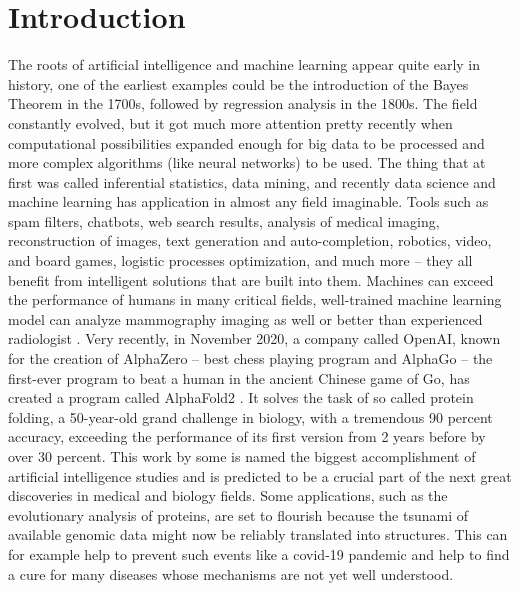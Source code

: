 \documentclass[a4paper,twoside,12pt]{book}
\newcounter{PagesWithoutNumbers}
\begin{document}
\setcounter{PagesWithoutNumbers}{\value{page}}
\mainmatter
\pagestyle{PageNumbersChapterTitles}



\chapter{Introduction}

The roots of artificial intelligence and machine learning appear quite early in history, one of the earliest examples could be the introduction of the Bayes Theorem in the 1700s, followed by regression analysis in the 1800s. The field constantly evolved, but it got much more attention pretty recently when computational possibilities expanded enough for big data to be processed and more complex algorithms (like neural networks) to be used.
The thing that at first was called inferential statistics, data mining, and recently data science and machine learning has application in almost any field imaginable. Tools such as spam filters, chatbots, web search results, analysis of medical imaging, reconstruction of images, text generation and auto-completion, robotics, video, and board games, logistic processes optimization, and much more -- they all benefit from intelligent solutions that are built into them.
Machines can exceed the performance of humans in many critical fields, well-trained machine learning model can analyze mammography imaging as well or better than experienced radiologist \cite{inproceedings}. Very recently, in November 2020, a company called OpenAI, known for the creation of AlphaZero \cite{silver2017mastering} -- best chess playing program and AlphaGo \cite{alpha_go} -- the first-ever program to beat a human in the ancient Chinese game of Go, has created a program called AlphaFold2 \cite{alpha_fold}. It solves the task of so called protein folding, a 50-year-old grand challenge in biology, with a tremendous 90 percent accuracy, exceeding the performance of its first version from 2 years before by over 30 percent. This work by some is named the biggest accomplishment of artificial intelligence studies and is predicted to be a crucial part of the next great discoveries in medical and biology fields. Some applications, such as the evolutionary analysis of proteins, are set to flourish because the tsunami of available genomic data might now be reliably translated into structures. This can for example help to prevent such events like a covid-19 pandemic and help to find a cure for many diseases whose mechanisms are not yet well understood.
\end{document}

